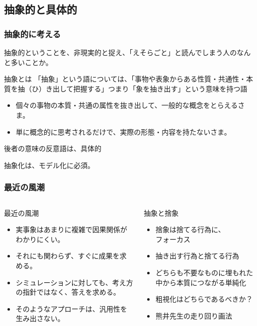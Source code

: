 \documentclass[12pt, dvipdfmx]{beamer}
\begin{document}
\subsection{抽象的と具体的}
\begin{frame}
    \frametitle{抽象的に考える}
    抽象的ということを、非現実的と捉え、「えそらごと」と読んでしまう人のなんと多いことか。

    \begin{exampleblock}{抽象とは}
        「抽象」という語については、「事物や表象からある性質・共通性・本質を抽（ひ）き出して把握する」つまり「象を抽き出す」という意味を持つ語
        \begin{itemize}
            \item 個々の事物の本質・共通の属性を抜き出して、一般的な概念をとらえるさま。
            \item 単に概念的に思考されるだけで、実際の形態・内容を持たないさま。
        \end{itemize}
        後者の意味の反意語は、具体的
    \end{exampleblock}
    \large{\alert{抽象化は、モデル化に必須。}}
\end{frame}

\begin{frame}
    \frametitle{最近の風潮}
    \begin{columns}[T, onlytextwidth]
            \begin{block}{最近の風潮}
                \begin{itemize}
                    \item 実事象はあまりに複雑で因果関係がわかりにくい。
                    \item それにも関わらず、すぐに成果を求める。
                    \item シミュレーションに対しても、考え方の指針ではなく、答えを求める。
                    \item そのようなアプローチは、汎用性を生み出さない。
                \end{itemize}
            \end{block}
            \begin{exampleblock}{抽象と捨象}
                \begin{itemize}
                    \item 捨象は捨てる行為に、\\フォーカス
                    \item 抽き出す行為と捨てる行為
                    \item どちらも不要なものに埋もれた中から本質につながる単純化
                    \item 粗視化はどちらであるべきか？
                    \item 熊井先生の走り回り画法
                \end{itemize}
            \end{exampleblock}
    \end{columns} 
\end{frame}
\end{document}
